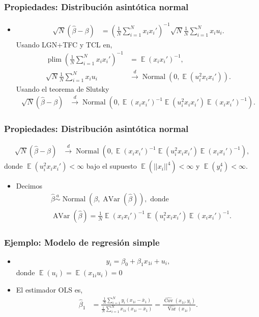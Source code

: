 \documentclass[t, compress, spanish, aspectratio=169]{beamer}
\DeclareMathOperator{\plim}{plim}
\DeclareMathOperator{\Var}{Var}
\DeclareMathOperator{\Avar}{AVar}
\DeclareMathOperator{\Cov}{Cov}
\DeclareMathOperator{\N}{Normal}
\DeclareMathOperator{\E}{\mathbb{E}}
\newcommand{\dto}{\stackrel{d}{\longrightarrow}}
\newcommand{\adistr}{\stackrel{a}{\sim}}
\newcommand{\term}[1]{\structure{\textbf{#1}}} %
\begin{document}
	\begin{frame}
		\frametitle{Propiedades: Distribuci\'on asint\'otica normal}
		\begin{itemize}
			\item \term{Demostraci\'on}
			\begin{align*}
				\sqrt{N} (\hat \beta - \beta)&= \left( \frac{1}{N}\sum_{i=1}^{N}x_ix_i'\right)^{-1} \sqrt{N}\frac{1}{N}\sum_{i=1}^{N}x_iu_i.
			\end{align*}
			Usando LGN+TFC y TCL en,
			\begin{align*}
				\plim\left(  \frac{1}{N}\sum_{i=1}^{N}x_ix_i'\right)^{-1}& = \E(x_ix_i')^{-1},\\
				\sqrt{N}\frac{1}{N}\sum_{i=1}^{N}x_iu_i &\dto \N (0,\E(u_i^2 x_i x_i')).
			\end{align*}
			Usando el teorema de Slutsky
			\begin{align*}
				\sqrt{N} (\hat \beta - \beta) &\dto \N (0,\E(x_ix_i')^{-1}\E(u_i^2 x_i x_i')\E(x_ix_i')^{-1}).
			\end{align*}
		\end{itemize}
	\end{frame}
	\begin{frame}
		\frametitle{Propiedades: Distribuci\'on asint\'otica normal}
		\begin{align*}
			\sqrt{N} (\hat \beta - \beta) &\dto \N (0,\E(x_ix_i')^{-1}\E(u_i^2 x_i x_i')\E(x_ix_i')^{-1}),
		\end{align*}
		donde $\E(u_i^2 x_i x_i')<\infty$ bajo el supuesto $\E(||x_i||^4)<\infty$ y $\E(y_i^4)<\infty$.
		\begin{itemize}
			\item Decimos
			\begin{align*}
				&\hat \beta \adistr \N(\beta,\Avar(\hat\beta)),\text{ donde}\\
				&\Avar(\hat\beta)=\frac{1}{N}\E(x_ix_i')^{-1}\E(u_i^2 x_i x_i')\E(x_ix_i')^{-1}.
			\end{align*}
		\end{itemize}
	\end{frame}
	
	\begin{frame}
		\frametitle{Ejemplo: Modelo de regresi\'on simple}
		\small
		\begin{itemize}
			\item[]
			\begin{align*}
				y_i = \beta_0 + \beta_1 x_{1i}+u_i,
			\end{align*}
			donde $\E(u_i)=\E(x_{1i}u_i)=0$
			\item[] El estimador OLS es,
			\begin{align*}
				\hat \beta_1 & =\frac{\frac{1}{N}\sum_{i=1}^{N} y_{i}(x_{1i}-\bar x_1)}{\frac{1}{N}\sum_{i=1}^{N} x_{1i}(x_{1i}-\bar x_1)}=\frac{\widehat{\Cov}(x_{1i},y_i)}{\widehat{\Var}(x_{1i})}.
				\end{align*}
		\end{itemize}
	\end{frame}
	
\end{document}
